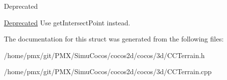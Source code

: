 \begin{DoxyRefDesc}{Deprecated}
\item[\hyperlink{deprecated__deprecated000280}{Deprecated}]Use get\+Intersect\+Point instead. \end{DoxyRefDesc}


The documentation for this struct was generated from the following files\+:\begin{DoxyCompactItemize}
\item 
/home/pmx/git/\+P\+M\+X/\+Simu\+Cocos/cocos2d/cocos/3d/C\+C\+Terrain.\+h\item 
/home/pmx/git/\+P\+M\+X/\+Simu\+Cocos/cocos2d/cocos/3d/C\+C\+Terrain.\+cpp\end{DoxyCompactItemize}
